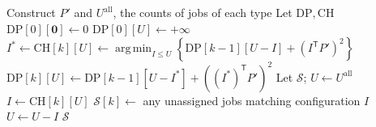 \documentclass[12pt,a4paper]{article}
\theoremstyle{definition}
\theoremstyle{plain}
\begin{document}
\begin{algorithm}[htbp]
\caption{$\textit{Exact-Scheduling}_C(\mathcal{I})$}
\begin{algorithmic}[1]
\State Construct $P'$ and $U^{\mathrm{all}}$, the counts of jobs of each type
\State Let $\mathrm{DP},\mathrm{CH}$
\State $\mathrm{DP}[0][\mathbf{0}]\gets0$
\State $\mathrm{DP}[0][U]\gets+\infty$
\EndFor
{}
\State $I^*\gets\mathrm{CH}[k][U]\gets\displaystyle\operatorname*{arg\,min}_{I\leq U}\left\{\mathrm{DP}[k-1][U-I]+(I^{\mathsf T}P')^2\right\}$
\State $\mathrm{DP}[k][U]\gets\mathrm{DP}[k-1][U-I^*]+((I^*)^{\mathsf T}P')^2$
\EndFor
\EndFor
\State Let $\mathcal{S}$; $U\gets U^{\mathrm{all}}$
\State $I\gets\mathrm{CH}[k][U]$
\State $\mathcal{S}[k]\gets$ any unassigned jobs matching configuration $I$
\State $U\gets U-I$
\EndFor
\State \Return $\mathcal{S}$
\end{algorithmic}
\end{algorithm}
\end{document}

